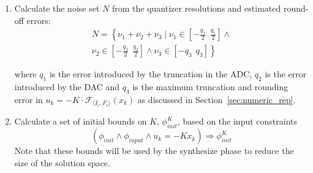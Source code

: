 \documentclass[twocolumn]{autart}    %
\newcommand{\mat}[1]{{#1}}
\begin{document}
\begin{enumerate}
\begin{enumerate}

\item Calculate the noise set $N$ from the quantizer resolutions and estimated round-off errors: %
%
\begin{equation}
\nonumber
\begin{split}
N=\left \{ \nu_1+\nu_2+ \nu_3 \mid \nu_1 \in \left[-\frac{q_1}{2}\ \ \frac{q_1}{2}\right] 
\wedge \right. \\ \left. \nu_2 \in \left[-\frac{q_2}{2}\ \ \frac{q_2}{2}\right]  \wedge  \nu_3 \in \left[-q_3\ \ q_3\right]  \right \}
\end{split}
\end{equation}

%
where  $q_1$ is the error introduced by the truncation in the ADC, $q_2$ is
the error introduced by the DAC and $q_3$ is the maximum truncation and
rounding error in $u_k=-K \cdot \mathcal{F}_{\langle I_c,F_c \rangle}(x_k)$ as
discussed in Section~\ref{sec:numeric_rep}. %

\item Calculate a set of initial bounds on $K$, $\phi_\mathit{init}^{K}$,
based on the input constraints %
%
$$(\phi_\mathit{init} \wedge \phi_\mathit{input} \wedge u_k=-K x_k)
\Rightarrow \phi_\mathit{init}^{K}$$
Note that these bounds will be used by the {\sc synthesize} phase to reduce the size of the solution space. 


\end{enumerate}
\end{enumerate}
\end{document}
